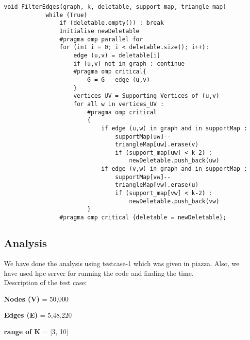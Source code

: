 \documentclass[12pt,a4paper]{article}
\begin{document}
\begin{center}
    \begin{minipage}{0.9\linewidth}
        \begin{lstlisting}[gobble=8]
        void FilterEdges(graph, k, deletable, support_map, triangle_map)
            while (True)
                if (deletable.empty()) : break
                Initialise newDeletable
                #pragma omp parallel for
                for (int i = 0; i < deletable.size(); i++):
                    edge (u,v) = deletable[i]
                    if (u,v) not in graph : continue
                    #pragma omp critical{
                        G = G - edge (u,v)
                    }
                    vertices_UV = Supporting Vertices of (u,v)
                    for all w in vertices_UV :        
                        #pragma omp critical
                        {
                            if edge (u,w) in graph and in supportMap :
                                supportMap[uw]--
                                triangleMap[uw].erase(v)
                                if (support_map[uw] < k-2) :
                                    newDeletable.push_back(uw)
                            if edge (v,w) in graph and in supportMap : 
                                supportMap[vw]--
                                triangleMap[vw].erase(u)
                                if (support_map[vw] < k-2) :
                                    newDeletable.push_back(vw)
                        }                  
                #pragma omp critical {deletable = newDeletable};
        \end{lstlisting}
    \end{minipage}
\end{center}


\subsection{Analysis}
We have done the analysis using testcase-1 which was given in piazza. Also, we have used hpc server for running the code and finding the time.\\
Description of the test case: 
\item \textbf{Nodes (V)} = 50,000
\vspace{-3mm}
\item \textbf{Edges (E)} = 5,48,220
\vspace{-3mm}
\item \textbf{range of K} = [3, 10]
\end{document}
